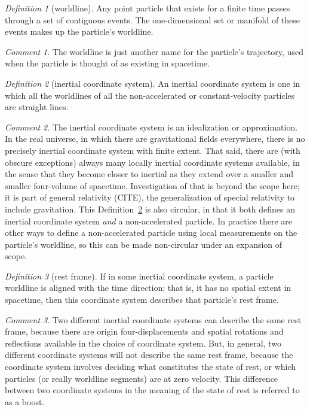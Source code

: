 \documentclass[10pt]{article}
\newcounter{par}
\theoremstyle{remark}
\newtheorem{definition}{Definition}
\newcommand{\defref}[1]{Definition~\ref{#1}}
\theoremstyle{remark}
\newtheorem*{remark}{Comment}
\begin{document}
\begin{definition}[worldline]
    Any point particle that exists for a finite time passes through a set of contiguous events.
    The one-dimensional set or manifold of these events makes up the particle's worldline.
\end{definition}
\begin{remark}
    The worldline is just another name for the particle's trajectory, used when the particle is thought of as existing in spacetime.
\end{remark}

\begin{definition}[inertial coordinate system]\label{def:coordinates}
    An inertial coordinate system is one in which all the worldlines of all the non-accelerated or constant-velocity particles are straight lines.
\end{definition}
\begin{remark}
    The inertial coordinate system is an idealization or approximation.
    In the real universe, in which there are gravitational fields everywhere, there is no precisely inertial coordinate system with finite extent.
    That said, there are (with obscure exceptions) always many locally inertial coordinate systems available, in the sense that they become closer to inertial as they extend over a smaller and smaller four-volume of spacetime.
    Investigation of that is beyond the scope here; it is part of general relativity (CITE), the generalization of special relativity to include gravitation.
    This \defref{def:coordinates} is also circular, in that it both defines an inertial coordinate system \emph{and} a non-accelerated particle.
    In practice there are other ways to define a non-accelerated particle using local measurements on the particle's worldline, so this can be made non-circular under an expansion of scope. 
\end{remark}

\begin{definition}[rest frame]
    If in some inertial coordinate system, a particle worldline is aligned with the time direction; that is, it has no spatial extent in spacetime, then this coordinate system describes that particle's rest frame.
\end{definition}
\begin{remark}
    Two different inertial coordinate systems can describe the same rest frame, because there are origin four-displacements and spatial rotations and reflections available in the choice of coordinate system.
    But, in general, two different coordinate systems will not describe the same rest frame, because the coordinate system involves deciding what constitutes the state of rest, or which particles (or really worldline segments) are at zero velocity.
    This difference between two coordinate systems in the meaning of the state of rest is referred to as a boost.
\end{remark}
\end{document}
